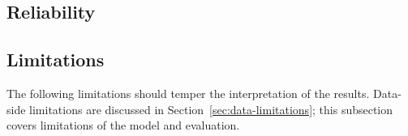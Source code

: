 \documentclass[sigconf,nonacm]{acmart}
\begin{document}
\subsection{Reliability}

\subsection{Limitations}
The following limitations should temper the interpretation of the
results. Data-side limitations are discussed in
Section~\ref{sec:data-limitations}; this subsection covers limitations
of the model and evaluation.
\end{document}
